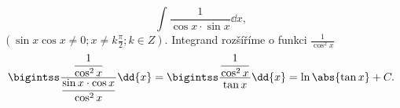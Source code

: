 \begin{mdframed}[style=mdexam]
  \begin{example}\label{MAI:exam134}
    \begin{equation}\label{MA:int_ex_08}
      \int\frac{1}{\cos x\cdot\sin x}\dd{x}, 
    \end{equation}
    \((\sin x\cos x\neq0; x\neq k\frac{\pi}{2}; k\in Z)\).
    Integrand rozšíříme o funkci $\displaystyle{\frac{1}{\cos^2x}}$
     \begin{equation*}
       \bigintss\dfrac{\dfrac{1}{\cos^2x}}{\dfrac{\sin x\cdot\cos x}{\cos^2x}} \dd{x} = 
       \bigintss\dfrac{\dfrac{1}{\cos^2x}}{\tan x}\dd{x} = \ln\abs{\tan x} + C.
     \end{equation*}    
  \end{example}
\end{mdframed}